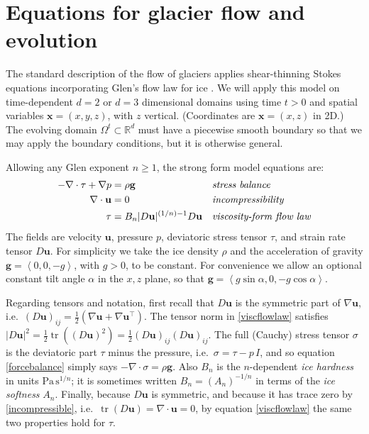 \documentclass[letterpaper,final,12pt,reqno]{amsart}
\newcommand{\RR}{\mathbb{R}}
\newcommand{\grad}{\nabla}
\newcommand{\Div}{\nabla\cdot}
\newcommand{\trace}{\operatorname{tr}}
\newcommand{\bg}{\mathbf{g}}
\newcommand{\bu}{\mathbf{u}}
\newcommand{\bx}{\mathbf{x}}
\begin{document}
\section{Equations for glacier flow and evolution} \label{sec:strongform}

The standard description of the flow of glaciers applies shear-thinning Stokes equations incorporating Glen's flow law for ice \cite{GreveBlatter2009,JouvetRappaz2011,SchoofHewitt2013}.  We will apply this model on time-dependent $d=2$ or $d=3$ dimensional domains using time $t>0$ and spatial variables $\bx=(x,y,z)$, with $z$ vertical.  (Coordinates are $\bx=(x,z)$ in 2D.)  The evolving domain $\Omega^t \subset \RR^d$ must have a piecewise smooth boundary so that we may apply the boundary conditions, but it is otherwise general.

Allowing any Glen exponent $n\ge 1$, the strong form model equations are:
\begin{align}
- \nabla \cdot \tau + \nabla p &= \rho \bg &&\text{\emph{stress balance}} \label{forcebalance} \\
\nabla \cdot \bu &= 0 &&\text{\emph{incompressibility}} \label{incompressible} \\
\tau &= B_n |D\bu|^{(1/n) - 1} D\bu  &&\text{\emph{viscosity-form flow law}} \label{viscflowlaw}
\end{align}
The fields are velocity $\bu$, pressure $p$, deviatoric stress tensor $\tau$, and strain rate tensor $D\bu$.  For simplicity we take the ice density $\rho$ and the acceleration of gravity $\bg=\left<0,0,-g\right>$, with $g>0$, to be constant.  For convenience we allow an optional constant tilt angle $\alpha$ in the $x,z$ plane, so that $\bg = \left<g\sin\alpha,0,-g\cos\alpha\right>$.

Regarding tensors and notation, first recall that $D\bu$ is the symmetric part of $\grad \bu$, i.e.~$(D\bu)_{ij} = \frac{1}{2} \left(\grad\bu + \grad\bu^\top\right)$.  The tensor norm in \eqref{viscflowlaw} satisfies $|D\bu|^2 = \frac{1}{2} \trace\left((D\bu)^2\right) = \frac{1}{2} (D\bu)_{ij} (D\bu)_{ij}$.  The full (Cauchy) stress tensor $\sigma$ is the deviatoric part $\tau$ minus the pressure, i.e.~$\sigma = \tau - p\,I$, and so equation \eqref{forcebalance} simply says $-\Div \sigma = \rho \bg$.  Also $B_n$ is the $n$-dependent \emph{ice hardness} in units $\text{Pa}\,\text{s}^{1/n}$; it is sometimes written $B_n = (A_n)^{-1/n}$ in terms of the \emph{ice softness} $A_n$.  Finally, because $D\bu$ is symmetric, and because it has trace zero by \eqref{incompressible}, i.e.~$\trace(D\bu)=\nabla \cdot \bu = 0$, by equation \eqref{viscflowlaw} the same two properties hold for $\tau$.
\end{document}
